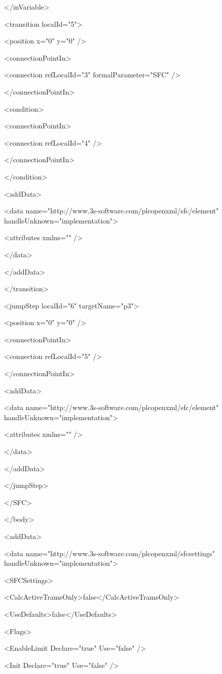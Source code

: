  </inVariable>

 <transition localId="5">

  <position x="0" y="0" />

  <connectionPointIn>

   <connection refLocalId="3" formalParameter="SFC" />

  </connectionPointIn>

  <condition>

   <connectionPointIn>

    <connection refLocalId="4" />

   </connectionPointIn>

  </condition>

  <addData>

   <data name="http://www.3s-software.com/plcopenxml/sfc/element" handleUnknown="implementation">

    <attributes xmlns="" />

   </data>

  </addData>

 </transition>

 <jumpStep localId="6" targetName="p3">

  <position x="0" y="0" />

  <connectionPointIn>

   <connection refLocalId="5" />

  </connectionPointIn>

  <addData>

   <data name="http://www.3s-software.com/plcopenxml/sfc/element" handleUnknown="implementation">

    <attributes xmlns="" />

   </data>

  </addData>

 </jumpStep>

</SFC>

</body>

<addData>

<data name="http://www.3s-software.com/plcopenxml/sfcsettings" handleUnknown="implementation">

 <SFCSettings>

  <CalcActiveTramsOnly>false</CalcActiveTramsOnly>

  <UseDefaults>false</UseDefaults>

  <Flags>

   <EnableLimit Declare="true" Use="false" />

   <Init Declare="true" Use="false" />

